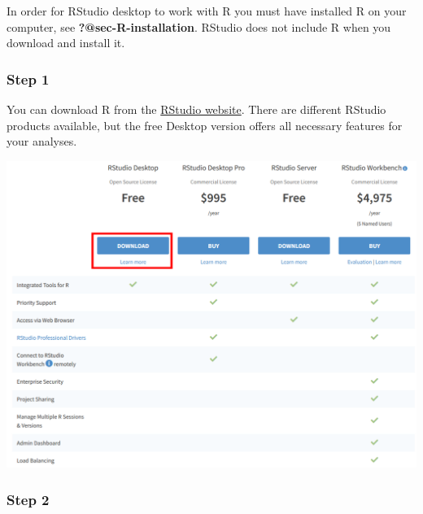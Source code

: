 \documentclass[
  letterpaper,
  DIV=11,
  numbers=noendperiod]{scrreprt}
\begin{document}
\begin{tcolorbox}[enhanced jigsaw, colframe=quarto-callout-important-color-frame, colback=white, rightrule=.15mm, bottomrule=.15mm, left=2mm, arc=.35mm, coltitle=black, title=\textcolor{quarto-callout-important-color}{\faExclamation}\hspace{0.5em}{Important}, opacitybacktitle=0.6, bottomtitle=1mm, opacityback=0, toptitle=1mm, toprule=.15mm, colbacktitle=quarto-callout-important-color!10!white, titlerule=0mm, leftrule=.75mm, breakable]
In order for RStudio desktop to work with R you must have installed R on
your computer, see \textbf{?@sec-R-installation}. RStudio does not
include R when you download and install it.
\end{tcolorbox}

\hypertarget{step-1-2}{%
\subsubsection{Step 1}\label{step-1-2}}

You can download R from the
\href{https://www.rstudio.com/products/rstudio/download/}{RStudio
website}. There are different RStudio products available, but the free
Desktop version offers all necessary features for your analyses.

\includegraphics{./images/paste-3C3D0718.png}

\hypertarget{step-2-2}{%
\subsubsection{Step 2}\label{step-2-2}}
\end{document}
